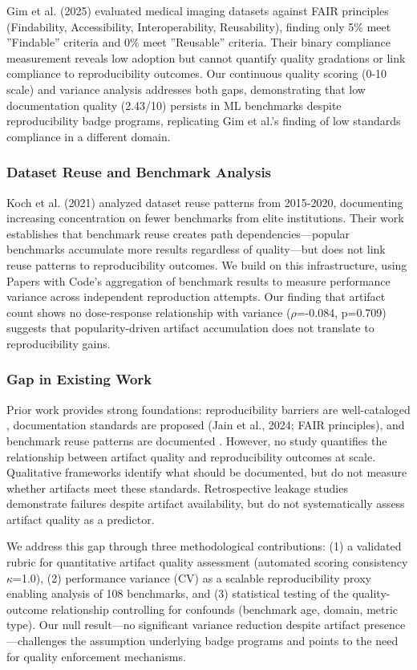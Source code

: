 Gim et al. (2025) evaluated medical imaging datasets against FAIR principles (Findability, Accessibility, Interoperability, Reusability), finding only 5\% meet ''Findable'' criteria and 0\% meet ''Reusable'' criteria. Their binary compliance measurement reveals low adoption but cannot quantify quality gradations or link compliance to reproducibility outcomes. Our continuous quality scoring (0-10 scale) and variance analysis addresses both gaps, demonstrating that low documentation quality (2.43/10) persists in ML benchmarks despite reproducibility badge programs, replicating Gim et al.'s finding of low standards compliance in a different domain.

\subsubsection{Dataset Reuse and Benchmark Analysis}

Koch et al. (2021) analyzed dataset reuse patterns from 2015-2020, documenting increasing concentration on fewer benchmarks from elite institutions. Their work establishes that benchmark reuse creates path dependencies---popular benchmarks accumulate more results regardless of quality---but does not link reuse patterns to reproducibility outcomes. We build on this infrastructure, using Papers with Code's aggregation of benchmark results to measure performance variance across independent reproduction attempts. Our finding that artifact count shows no dose-response relationship with variance ($\rho$=-0.084, p=0.709) suggests that popularity-driven artifact accumulation does not translate to reproducibility gains.

\subsubsection{Gap in Existing Work}

Prior work provides strong foundations: reproducibility barriers are well-cataloged \citep{Semmelrock2024}, documentation standards are proposed (Jain et al., 2024; FAIR principles), and benchmark reuse patterns are documented \citep{Koch2021}. However, no study quantifies the relationship between artifact quality and reproducibility outcomes at scale. Qualitative frameworks identify what should be documented, but do not measure whether artifacts meet these standards. Retrospective leakage studies \citep{Kapoor2023} demonstrate failures despite artifact availability, but do not systematically assess artifact quality as a predictor.

We address this gap through three methodological contributions: (1) a validated rubric for quantitative artifact quality assessment (automated scoring consistency $\kappa$=1.0), (2) performance variance (CV) as a scalable reproducibility proxy enabling analysis of 108 benchmarks, and (3) statistical testing of the quality-outcome relationship controlling for confounds (benchmark age, domain, metric type). Our null result---no significant variance reduction despite artifact presence---challenges the assumption underlying badge programs and points to the need for quality enforcement mechanisms.
